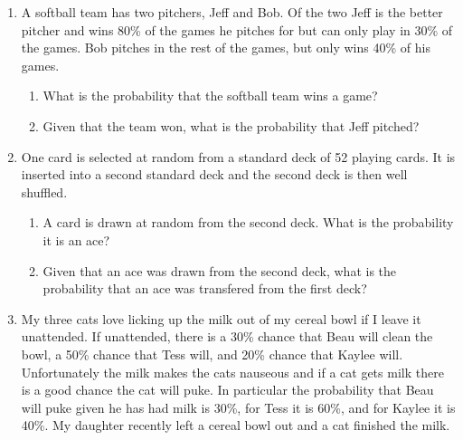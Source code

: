 \documentclass[]{book}
\providecommand{\tightlist}{%
  \setlength{\itemsep}{0pt}\setlength{\parskip}{0pt}}
\begin{document}
\begin{enumerate}
\def\labelenumi{\arabic{enumi}.}
\item
  A softball team has two pitchers, Jeff and Bob. Of the two Jeff is the
  better pitcher and wins 80\% of the games he pitches for but can only
  play in 30\% of the games. Bob pitches in the rest of the games, but
  only wins 40\% of his games.

  \begin{enumerate}
  \def\labelenumii{\alph{enumii})}
  \tightlist
  \item
    What is the probability that the softball team wins a game?
  \item
    Given that the team won, what is the probability that Jeff pitched?
  \end{enumerate}
\item
  One card is selected at random from a standard deck of 52 playing
  cards. It is inserted into a second standard deck and the second deck
  is then well shuffled.

  \begin{enumerate}
  \def\labelenumii{\alph{enumii})}
  \tightlist
  \item
    A card is drawn at random from the second deck. What is the
    probability it is an ace?
  \item
    Given that an ace was drawn from the second deck, what is the
    probability that an ace was transfered from the first deck?
  \end{enumerate}
\item
  My three cats love licking up the milk out of my cereal bowl if I
  leave it unattended. If unattended, there is a 30\% chance that Beau
  will clean the bowl, a 50\% chance that Tess will, and 20\% chance
  that Kaylee will. Unfortunately the milk makes the cats nauseous and
  if a cat gets milk there is a good chance the cat will puke. In
  particular the probability that Beau will puke given he has had milk
  is 30\%, for Tess it is 60\%, and for Kaylee it is 40\%. My daughter
  recently left a cereal bowl out and a cat finished the milk.


\end{enumerate}
\end{document}
